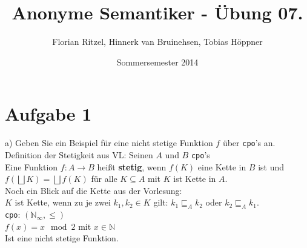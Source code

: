 \documentclass[ngerman,a4paper]{report}
\author{Florian Ritzel, Hinnerk van Bruinehsen, Tobias Höppner}
\title{Anonyme Semantiker - Übung 07. }
\date{Sommersemester 2014}
\renewcommand{\maketitle}{}
\begin{document}
\maketitle
\section*{Aufgabe 1}
\begin{compactenum}
\item[a)] Geben Sie ein Beispiel für eine nicht stetige Funktion $f$ über \lstinline!cpo!'s an.\\
Definition der Stetigkeit aus VL: Seinen $A$ und $B$ \lstinline!cpo!'s\\
Eine Funktion $f: A \rightarrow B$ heißt \textbf{stetig}, wenn $f(K)$ eine Kette in $B$ ist und $f(\bigsqcup K) = \bigsqcup f(K)$ für alle $K \subseteq A$ mit $K$ ist Kette in $A$.\\

Noch ein Blick auf die Kette aus der Vorlesung:\\
$K$ ist Kette, wenn zu je zwei $k_1, k_2 \in K$ gilt: $k_1 \sqsubseteq_A k_2$ oder $k_2 \sqsubseteq_A k_1$.\\

\lstinline!cpo!: $(\mathbb{N}_\infty,\leq)$\\
$f(x) = x \mod 2$ mit $x \in \mathbb{N}$\\
Ist eine nicht stetige Funktion.\\
%



\end{compactenum}
\end{document}
